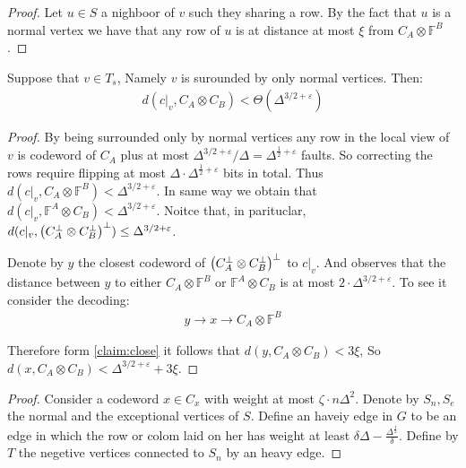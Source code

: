  \begin{proof}
   Let $u \in S$ a nighboor of $v$ such they sharing a row. By the fact that $u$ is a normal vertex we have that any row of $u$ is at distance at most $\xi$ from $C_{A} \otimes \mathbb{F}^{B}$.     
 \end{proof}
\begin{claim}
  Suppose that $v \in T_{s}$, Namely $v$ is surounded by only normal vertices. Then:
  \begin{equation*}
    \begin{split}
      d\left( c|_{v}, C_{A}\otimes C_{B}\right) < \Theta\left( \Delta^{3/2+\varepsilon} \right)
    \end{split}
  \end{equation*} 
 \end{claim}
\begin{proof}
  By being surrounded only by normal vertices any row in the local view of $v$ is codeword of $C_{A}$ plus at most $\Delta^{3/2 + \varepsilon}/\Delta = \Delta^{\frac{1}{2}+\varepsilon}$ faults. So correcting the rows require flipping at most $\Delta \cdot \Delta^{\frac{1}{2} + \varepsilon}$ bits in total.  Thus $d\left(c|_{v}, C_{A}\otimes \mathbb{F}^{B}\right) < \Delta^{3/2 + \varepsilon}$. In same way we obtain that $d\left(c|_{v},  \mathbb{F}^{A} \otimes C_{B}\right) < \Delta^{3/2 + \varepsilon}$. Noitce that, in parituclar, $d(c|_{v}, \left( C_{A}^{\perp}\otimes C_{B}^{\perp} \right)^{\perp}) \le \Delta^{3/2 + \varepsilon}$.

  Denote by $y$ the closest codeword of $\left( C_{A}^{\perp}\otimes C_{B}^{\perp} \right)^{\perp}$ to $c|_{v}$. And observes that the distance between $y$ to either $C_{A} \otimes \mathbb{F}^{B}$ or $\mathbb{F}^{A}\otimes C_{B}$ is at most $2 \cdot \Delta^{3/2 + \varepsilon}$. To see it consider the decoding: 
  \begin{equation*}
    \begin{split}
  y \rightarrow x \rightarrow C_{A} \otimes \mathbb{F}^{B}   
    \end{split}
  \end{equation*}
  
  Therefore form \cref{claim:close} it follows that $d\left(y, C_{A} \otimes C_{B}\right) < 3 \xi $, So $d\left(x, C_{A} \otimes C_{B}\right) < \Delta^{3/2 + \varepsilon} +  3 \xi $.
     \end{proof}
 
 \begin{remark}
   
 \end{remark}

 \begin{proof}
   Consider a codeword $x \in C_{x}$ with weight at most $\zeta \cdot n\Delta^{2} $. Denote by $S_{n}, S_{e}$ the normal and the exceptional vertices of $S$. Define an haveiy edge in $G$ to be an edge in which the row or colom laid on her has weight at least $\delta\Delta - \frac{\Delta^{\frac{1}{2}}}{\delta}$. Define by $T$ the negetive vertices connected to $S_{n}$ by an heavy edge.     
 \end{proof}
 
